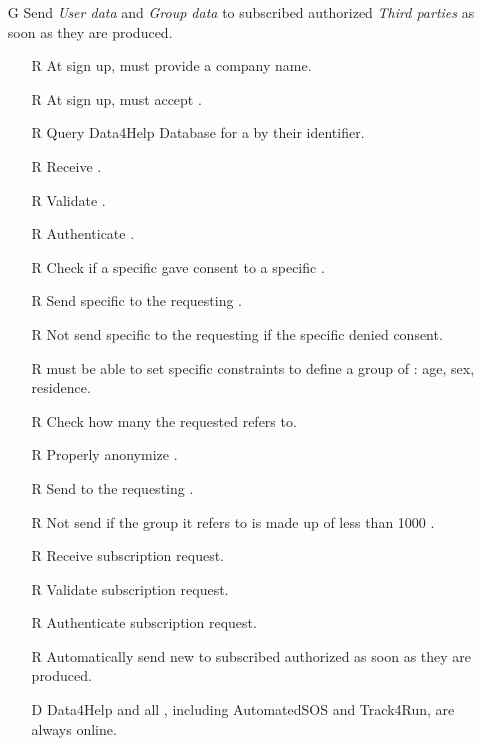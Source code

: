 \documentclass[../../../rasd.tex]{subfiles}
\begin{document}
\begin{itemize}
	\item[G\subs{4}]Send \textit{User data} and \textit{Group data} to subscribed authorized \textit{Third parties} as soon as they are produced.
	\begin{itemize}
		\item[R\subs{3}]At sign up,  must provide a company name.
		\item[R\subs{5}]At sign up,  must accept .
        \item[R\subs{7}]Query Data4Help Database for a  by their identifier.
		\item[R\subs{8}]Receive .
		\item[R\subs{9}]Validate .
		\item[R\subs{10}]Authenticate .
		\item[R\subs{18}]Check if a specific  gave consent to a specific .
		\item[R\subs{19}]Send specific to the requesting .
		\item[R\subs{20}]Not send specific to the requesting  if the specific  denied consent.
		\item[R\subs{21}] must be able to set specific constraints to define a group of : age, sex, residence.
		\item[R\subs{22}]Check how many  the requested  refers to.
		\item[R\subs{23}]Properly anonymize .
		\item[R\subs{24}]Send  to the requesting .
		\item[R\subs{25}]Not send  if the group it refers to is made up of less than 1000 .
		\item[R\subs{26}]Receive  subscription request.
		\item[R\subs{27}]Validate  subscription request.
		\item[R\subs{28}]Authenticate  subscription request.
		\item[R\subs{29}]Automatically send new  to subscribed authorized  as soon as they are produced.
		\\
		\item[D\subs{9}]Data4Help and all , including AutomatedSOS and Track4Run, are always online.

\end{itemize}
\end{itemize}
\end{document}
